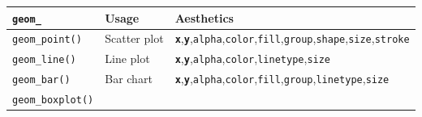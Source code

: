 \documentclass[]{book}
\begin{document}
\begin{longtable}[]{@{}lll@{}}
\toprule
\begin{minipage}[b]{0.13\columnwidth}\raggedright
\texttt{geom\_}\strut
\end{minipage} & \begin{minipage}[b]{0.14\columnwidth}\raggedright
Usage\strut
\end{minipage} & \begin{minipage}[b]{0.65\columnwidth}\raggedright
Aesthetics\strut
\end{minipage}\tabularnewline
\midrule
\endhead
\begin{minipage}[t]{0.13\columnwidth}\raggedright
\texttt{geom\_point()}\strut
\end{minipage} & \begin{minipage}[t]{0.14\columnwidth}\raggedright
Scatter plot\strut
\end{minipage} & \begin{minipage}[t]{0.65\columnwidth}\raggedright
\textbf{\texttt{x}},\textbf{\texttt{y}},\texttt{alpha},\texttt{color},\texttt{fill},\texttt{group},\texttt{shape},\texttt{size},\texttt{stroke}\strut
\end{minipage}\tabularnewline
\begin{minipage}[t]{0.13\columnwidth}\raggedright
\texttt{geom\_line()}\strut
\end{minipage} & \begin{minipage}[t]{0.14\columnwidth}\raggedright
Line plot\strut
\end{minipage} & \begin{minipage}[t]{0.65\columnwidth}\raggedright
\textbf{\texttt{x}},\textbf{\texttt{y}},\texttt{alpha},\texttt{color},\texttt{linetype},\texttt{size}\strut
\end{minipage}\tabularnewline
\begin{minipage}[t]{0.13\columnwidth}\raggedright
\texttt{geom\_bar()}\strut
\end{minipage} & \begin{minipage}[t]{0.14\columnwidth}\raggedright
Bar chart\strut
\end{minipage} & \begin{minipage}[t]{0.65\columnwidth}\raggedright
\textbf{\texttt{x}},\textbf{\texttt{y}},\texttt{alpha},\texttt{color},\texttt{fill},\texttt{group},\texttt{linetype},\texttt{size}\strut
\end{minipage}\tabularnewline
\begin{minipage}[t]{0.13\columnwidth}\raggedright
\texttt{geom\_boxplot()}\strut

\end{minipage}
\end{longtable}
\end{document}
